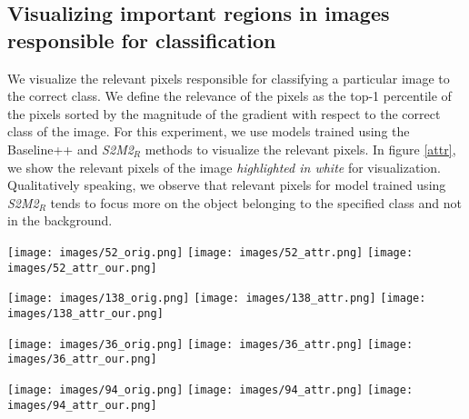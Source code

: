 \documentclass[10pt,twocolumn,letterpaper]{article}
\begin{document}
\subsection{Visualizing important regions in images responsible for classification}
We visualize the relevant pixels responsible for classifying a particular image to the correct class. We define the relevance of the pixels as the top-1 percentile of the pixels sorted by the magnitude of the gradient with respect to the correct class of the image. For this experiment, we use models trained using the Baseline++ \cite{chen2019closerfewshot} and \textit{S2M2$_R$} methods to visualize the relevant pixels. In figure \ref{attr}, we show the relevant pixels of the image \textit{highlighted in white} for visualization. Qualitatively speaking, we observe that relevant pixels for model trained using \textit{S2M2$_R$} tends to focus more on the object belonging to the specified class and not in the background.



\begin{minipage}{\textwidth}
\centering
    \texttt{[image: images/52\_orig.png]} \hspace{0.05cm}
    \texttt{[image: images/52\_attr.png]}
    \hspace{0.05cm}
    \texttt{[image: images/52\_attr\_our.png]}


    \texttt{[image: images/138\_orig.png]}
    \hspace{0.05cm}
    \texttt{[image: images/138\_attr.png]}
    \hspace{0.05cm}
    \texttt{[image: images/138\_attr\_our.png]}
    
    \texttt{[image: images/36\_orig.png]} \hspace{0.05cm}
    \texttt{[image: images/36\_attr.png]}
    \hspace{0.05cm}
    \texttt{[image: images/36\_attr\_our.png]}

    \texttt{[image: images/94\_orig.png]}
    \hspace{0.05cm}
    \texttt{[image: images/94\_attr.png]}
    \hspace{0.05cm}
    \texttt{[image: images/94\_attr\_our.png]}
    
    
    
    \label{attr}
\end{minipage}
\end{document}

